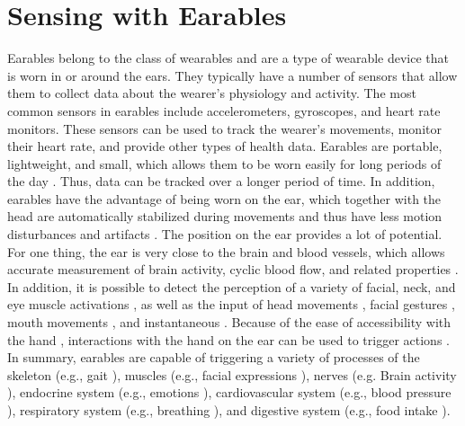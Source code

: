 \section{Sensing with Earables}
\label{Background:SensingWithEarables}
Earables belong to the class of wearables and are a type of wearable device that is worn in or around the ears. 
They typically have a number of sensors that allow them to collect data about the wearer's physiology and activity. 
The most common sensors in earables include accelerometers, gyroscopes, and heart rate monitors. 
These sensors can be used to track the wearer's movements, monitor their heart rate, and provide other types of health data.
Earables are portable, lightweight, and small, which allows them to be worn easily for long periods of the day \cite{roddigerSensingEarablesSystematic2022a}. 
Thus, data can be tracked over a longer period of time. In addition, earables have the advantage of being worn on the ear, which together with the head are automatically stabilized during movements and thus have less motion disturbances and artifacts \cite{grossmanFrequencyVelocityRotational1988, kavanaghRoleNeckTrunk2006a}.
The position on the ear provides a lot of potential. 
For one thing, the ear is very close to the brain and blood vessels, which allows accurate measurement of brain activity, cyclic blood flow, and related properties \cite{ferliniInEarPPGVital2022}.
In addition, it is possible to detect the perception of a variety of facial, neck, and eye muscle activations \cite{andoCanalSenseFaceRelatedMovement2017}, as well as the input of head movements \cite{andoCanalSenseFaceRelatedMovement2017}, facial gestures \cite{matthiesEarFieldSensingNovelInEar2017}, mouth movements \cite{sunTeethTapRecognizingDiscrete2021a}, and instantaneous \cite{bleichnerConcealedUnobtrusiveEarCentered2017, phamWAKEBehindtheearWearable2020}. 
Because of the ease of accessibility with the hand \cite{kikuchiEarTouchTurningEar2017, xuEarBuddyEnablingOnFace2020}, interactions with the hand on the ear can be used to trigger actions \cite{lissermannEarPutAugmentingEarworn2014}.
In summary, earables are capable of triggering a variety of processes of the skeleton (e.g., gait \cite{atallahGaitAsymmetryDetection2014}), muscles (e.g., facial expressions \cite{matthiesEarFieldSensingNovelInEar2017}), nerves (e.g. Brain activity \cite{debenerUnobtrusiveAmbulatoryEEG2015}), endocrine system (e.g., emotions \cite{athavipachWearableInEarEEG2019}), cardiovascular system (e.g., blood pressure \cite{atallahValidationEarwornSensor2012}), respiratory system (e.g., breathing \cite{roddigerRespirationRateMonitoring2020}), and digestive system (e.g., food intake \cite{gaoIHearFoodEating2016}).

